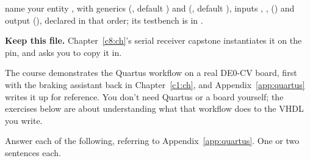 
\selfcheck name your entity , with generics  (,
default ) and  (, default ), inputs ,
,  () and output
 (), declared in that order; its testbench
is in .

\textbf{Keep this file.} Chapter~\ref{c8:ch}'s serial receiver capstone instantiates it on the
 pin, and asks you to copy it in.

\label{c5:set:3}
The course demonstrates the Quartus workflow on a real DE0-CV board, first with the braking
assistant back in Chapter~\ref{c1:ch}, and Appendix~\ref{app:quartus} writes it up for reference.
You don't need Quartus or a board yourself; the exercises below are about understanding what that
workflow does to the VHDL you write.

\label{c5:ex:5}
Answer each of the following, referring to Appendix~\ref{app:quartus}. One or two sentences each.

